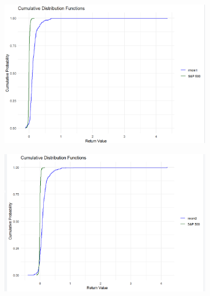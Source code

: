 \documentclass{article}
\begin{document}
\begin{figure}[H]
    \centering
    \begin{subfigure}{0.45\textwidth}
        \centering
        \includegraphics[width=\textwidth]{25.png}
        \label{fig:image25}
    \end{subfigure}
    \hspace{0.05\textwidth}
    \begin{subfigure}{0.45\textwidth}
        \centering
        \includegraphics[width=\textwidth]{26.png}
        \label{fig:image26}
    \end{subfigure}


\end{figure}
\end{document}
